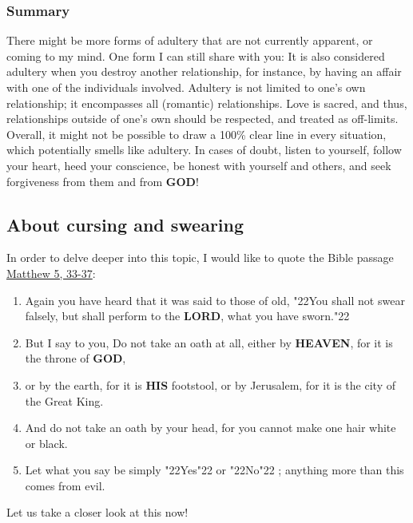 \documentclass[10pt,a5paper]{article}
\newcommand{\God}[0]{\textbf{GOD}}
\newcommand{\Heaven}[0]{\textbf{HEAVEN}}
\newcommand{\His}[0]{\textbf{HIS}}
\newcommand{\Lord}[0]{\textbf{LORD}}
\newcommand{\q}[1]{\char"22{#1}\char"22 }
\begin{document}
	\subsubsection{Summary}
		There might be more forms of adultery that are not currently apparent,
		or coming to my mind.
		One form I can still share with you:
		It is also considered adultery when you destroy another relationship,
		for instance,
		by having an affair with one of the individuals involved.
		Adultery is not limited to one's own relationship;
		it encompasses all (romantic) relationships.
		Love is sacred,
		and thus,
		relationships outside of one's own should be respected,
		and treated as off-limits.
		\\
		Overall,
		it might not be possible to draw a 100\% clear line in every situation,
		which potentially smells like adultery.
		In cases of doubt,
		listen to yourself,
		follow your heart,
		heed your conscience,
		be honest with yourself and others,
		and seek forgiveness from them and from {\God}!

	\subsection{About cursing and swearing}
		In order to delve deeper into this topic,
		I would like to quote the Bible passage \href{https://www.die-bibel.de/bibeln/online-bibeln/lesen/ESV/MAT.5/Matthew-5}{Matthew 5, 33-37}:
		\begin{enumerate}[noitemsep,start=33]
			\item	Again you have heard that it was said to those of old,
					\q{You shall not swear falsely,
					but shall perform to the {\Lord},
					what you have sworn.}
			\item	But I say to you,
					Do not take an oath at all,
					either by {\Heaven},
					for it is the throne of {\God},
			\item	or by the earth,
					for it is {\His} footstool,
					or by Jerusalem,
					for it is the city of the Great King.
			\item	And do not take an oath by your head,
					for you cannot make one hair white or black.
			\item	Let what you say be simply \q{Yes} or \q{No};
					anything more than this comes from evil.
		\end{enumerate}
		Let us take a closer look at this now!
\end{document}
